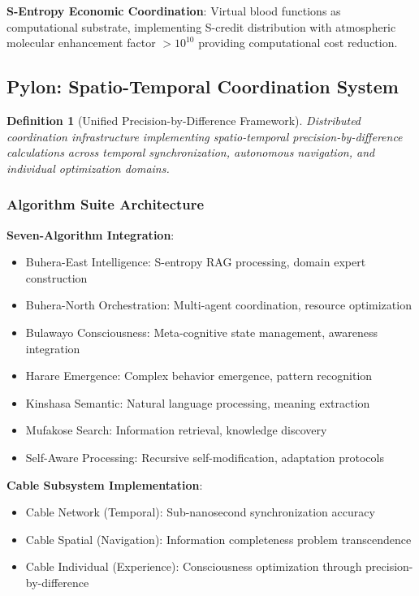 \documentclass[12pt,a4paper]{article}
\newtheorem{definition}[theorem]{Definition}
\begin{document}
\textbf{S-Entropy Economic Coordination}:
Virtual blood functions as computational substrate, implementing S-credit distribution with atmospheric molecular enhancement factor $> 10^{10}$ providing computational cost reduction.

\subsection{Pylon: Spatio-Temporal Coordination System}

\begin{definition}[Unified Precision-by-Difference Framework]
Distributed coordination infrastructure implementing spatio-temporal precision-by-difference calculations across temporal synchronization, autonomous navigation, and individual optimization domains.
\end{definition}

\subsubsection{Algorithm Suite Architecture}

\textbf{Seven-Algorithm Integration}:
\begin{itemize}
\item Buhera-East Intelligence: S-entropy RAG processing, domain expert construction
\item Buhera-North Orchestration: Multi-agent coordination, resource optimization
\item Bulawayo Consciousness: Meta-cognitive state management, awareness integration
\item Harare Emergence: Complex behavior emergence, pattern recognition
\item Kinshasa Semantic: Natural language processing, meaning extraction
\item Mufakose Search: Information retrieval, knowledge discovery
\item Self-Aware Processing: Recursive self-modification, adaptation protocols
\end{itemize}

\textbf{Cable Subsystem Implementation}:
\begin{itemize}
\item Cable Network (Temporal): Sub-nanosecond synchronization accuracy
\item Cable Spatial (Navigation): Information completeness problem transcendence
\item Cable Individual (Experience): Consciousness optimization through precision-by-difference
\end{itemize}
\end{document}

